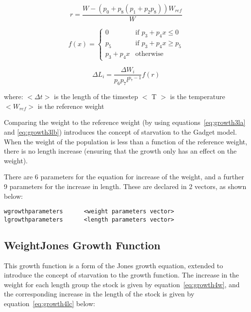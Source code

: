 \documentclass[10pt,twoside]{book}
\begin{document}
\begin{equation}\label{eq:growth3la}
r = \frac{W - \left( p_{0} + p_{8} \left( p_{1} + p_{2}p_{8} \right) \right) W_{ref}}{W}
\end{equation}

\begin{equation}\label{eq:growth3lb}
f(x) =
\begin{cases}
0 & \textrm{if $p_{3} + p_{4}x \leq 0$} \\
p_{5} & \textrm{if $p_{3} + p_{4}x \geq p_{5}$} \\
p_{3} + p_{4}x & \textrm{otherwise}
\end{cases}
\end{equation}

\begin{equation}\label{eq:growth3lc}
\Delta L_{i} = \frac{\Delta W_{i}} {p_{6} p_{7} l^{p_{7} - 1}} f(r)
\end{equation}

where:\newline
$<\Delta t>$ is the length of the timestep\newline
$<$ T $>$ is the temperature\newline
$<W_{ref}>$ is the reference weight

\bigskip
Comparing the weight to the reference weight (by using equations~\ref{eq:growth3la} and \ref{eq:growth3lb}) introduces the concept of starvation to the Gadget model.  When the weight of the population is less than a function of the reference weight, there is no length increase (ensuring that the growth only has an effect on the weight).

\bigskip
There are 6 parameters for the equation for increase of the weight, and a further 9 parameters for the increase in length.  These are declared in 2 vectors, as shown below:

{\small\begin{verbatim}
wgrowthparameters      <weight parameters vector>
lgrowthparameters      <length parameters vector>
\end{verbatim}}

\subsection{WeightJones Growth Function}\label{subsec:growth4}
This growth function is a form of the Jones growth equation, extended to introduce the concept of starvation to the growth function.  The increase in the weight for each length group the stock is given by equation~\ref{eq:growth4w}, and the corresponding increase in the length of the stock is given by equation~\ref{eq:growth4lc} below:
\end{document}
